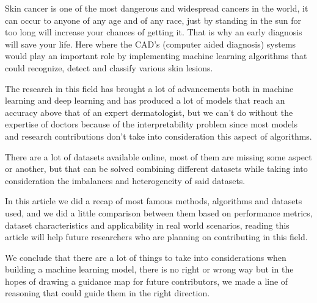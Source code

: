 Skin cancer is one of the most dangerous and widespread cancers in the world, it can occur to anyone of any age and of any race, just by standing in the sun for too long will increase your chances of getting it. That is why an early diagnosis will save your life. Here where the CAD's (computer aided diagnosis) systems would play an important role by implementing machine learning algorithms that could recognize, detect and classify various skin lesions.

The research in this field has brought a lot of advancements both in machine learning and deep learning and has produced a lot of models that reach an accuracy above that of an expert dermatologist, but we can't do without the expertise of doctors because of the interpretability problem since most models and research contributions don't take into consideration this aspect of algorithms.

There are a lot of datasets available online, most of them are missing some aspect or another, but that can be solved combining different datasets while taking into consideration the imbalances and heterogeneity of said datasets.

In this article we did a recap of most famous methods, algorithms and datasets used, and we did a little comparison between them based on performance metrics, dataset characteristics and applicability in real world scenarios, reading this article will help future researchers who are planning on contributing in this field.

We conclude that there are a lot of things to take into considerations when building a machine learning model, there is no right or wrong way but in the hopes of drawing a guidance map for future contributors, we made a line of reasoning that could guide them in the right direction. 





